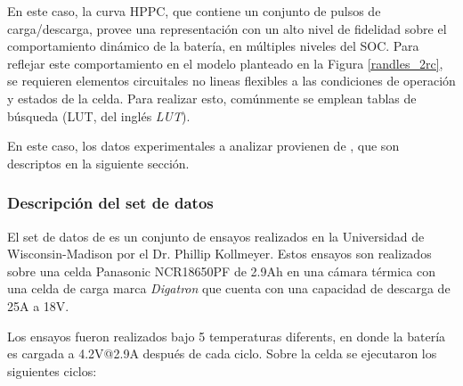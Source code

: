 \documentclass[10pt,a4paper]{article}
\begin{document}
En este caso, la curva \acrshort{HPPC}, que contiene un conjunto de pulsos de
carga/descarga, provee una representaci\'on con un alto nivel de fidelidad sobre
el comportamiento din\'amico de la bater\'ia, en m\'ultiples niveles del
\acrshort{SOC}. Para reflejar este comportamiento en el modelo planteado en la
Figura \ref{randles_2rc}, se requieren elementos circuitales no lineas flexibles
a las condiciones de operaci\'on y estados de la celda. Para realizar esto,
com\'unmente se emplean tablas de b\'usqueda (\acrshort{LUT}, del ingl\'es
\emph{\acrlong{LUT}}).

En este caso, los datos experimentales a analizar provienen de 
\cite{Kollmeyer2018}, que son descriptos en la siguiente secci\'on.

\subsubsection{Descripci\'on del set de datos}

El set de datos de  es un conjunto de ensayos realizados en 
la Universidad de Wisconsin-Madison por el Dr. Phillip Kollmeyer. Estos ensayos 
son realizados sobre una celda Panasonic NCR18650PF de 2.9Ah en una c\'amara 
t\'ermica con una celda de carga marca \emph{Digatron} que cuenta con una 
capacidad de descarga de 25A a 18V.

Los ensayos fueron realizados bajo 5 temperaturas diferents, en donde la
bater\'ia es cargada a 4.2V@2.9A despu\'es de cada ciclo. Sobre la celda se
ejecutaron los siguientes ciclos:
\end{document}
